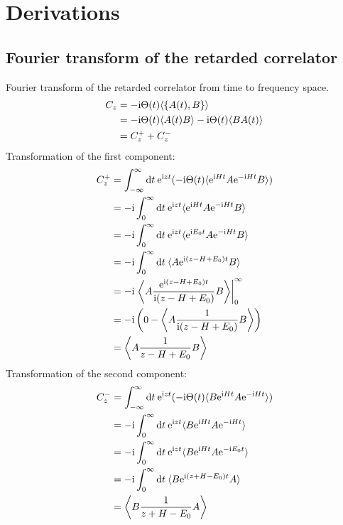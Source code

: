 
\chapter{Derivations}

\section{Fourier transform of the retarded correlator}
\label{app:fourier-transform}

Fourier transform of the retarded correlator from time to frequency space.
\begin{align}
    C_z
     & =
    -\mathrm{i} \Theta(t) \langle \{A(t), B\}\rangle                                 \\
     & =
    -\mathrm{i} \Theta(t) \langle A(t) B\rangle -\mathrm{i} \Theta(t) \langle B A(t)\rangle \\
     & =
    C^+_z + C^-_z
\end{align}
Transformation of the first component:
\begin{align}
    C^+_z
     & =
    \int_{-\infty}^\infty \mathrm{d} t \>
    \mathrm{e}^{\mathrm{i} zt}(-\mathrm{i} \Theta(t) \langle \mathrm{e}^{\mathrm{i} Ht} A \mathrm{e}^{-\mathrm{i} Ht} B\rangle)     \\
     & =
    -\mathrm{i} \int_0^\infty \mathrm{d} t \>
    \mathrm{e}^{\mathrm{i} zt} \langle \mathrm{e}^{\mathrm{i} Ht} A \mathrm{e}^{-\mathrm{i} Ht} B\rangle                     \\
     & =
    -\mathrm{i} \int_0^\infty \mathrm{d} t \>
    \mathrm{e}^{\mathrm{i} zt} \langle \mathrm{e}^{\mathrm{i} E_0t} A \mathrm{e}^{-\mathrm{i} Ht} B\rangle                   \\
     & =
    -\mathrm{i} \int_0^\infty \mathrm{d} t \>
    \langle A \mathrm{e}^{\mathrm{i}(z - H + E_0)t} B\rangle                                     \\
     & =
    -\mathrm{i} \left.\left\langle A \frac{\mathrm{e}^{\mathrm{i}(z - H + E_0)t}}{\mathrm{i}(z - H + E_0)} B\right\rangle
    \right|_0^\infty                                                               \\
     & =
    -\mathrm{i} \left(0 - \left\langle A \frac{1}{\mathrm{i}(z - H + E_0)} B\right\rangle\right) \\
     & =
    \left\langle A \frac{1}{z - H + E_0} B\right\rangle
\end{align}
Transformation of the second component:
\begin{align}
    C^-_z
     & =
    \int_{-\infty}^\infty \mathrm{d} t \>
    \mathrm{e}^{\mathrm{i} zt}(-\mathrm{i} \Theta(t) \langle B \mathrm{e}^{\mathrm{i} Ht} A \mathrm{e}^{-\mathrm{i} Ht}\rangle) \\
     & =
    -\mathrm{i} \int_0^\infty \mathrm{d} t \>
    \mathrm{e}^{\mathrm{i} zt} \langle B \mathrm{e}^{\mathrm{i} Ht} A \mathrm{e}^{-\mathrm{i} Ht}\rangle                 \\
     & =
    -\mathrm{i} \int_0^\infty \mathrm{d} t \>
    \mathrm{e}^{\mathrm{i} zt} \langle B \mathrm{e}^{\mathrm{i} Ht} A \mathrm{e}^{-\mathrm{i} E_0t}\rangle               \\
     & =
    -\mathrm{i} \int_0^\infty \mathrm{d} t \>
    \langle B \mathrm{e}^{\mathrm{i}(z + H - E_0)t} A\rangle                                 \\
     & =
    \left\langle B \frac{1}{z + H - E_0} A\right\rangle
\end{align}

